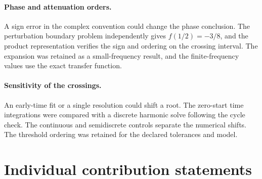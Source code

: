 \documentclass[11pt,a4paper]{article}
\begin{document}
\paragraph{Phase and attenuation orders.} A sign error in the complex convention could change the phase conclusion. The perturbation boundary problem independently gives $f(1/2)=-3/8$, and the product representation verifies the sign and ordering on the crossing interval. The expansion was retained as a small-frequency result, and the finite-frequency values use the exact transfer function.

\paragraph{Sensitivity of the crossings.} An early-time fit or a single resolution could shift a root. The zero-start time integrations were compared with a discrete harmonic solve following the cycle check. The continuous and semidiscrete controls separate the numerical shifts. The threshold ordering was retained for the declared tolerances and model.

\clearpage
\section{Individual contribution statements}
\newcommand{\record}[2]{\def\membername{#1}\def\memberid{#2}}
\record{Shenghao Lin}{2363483}
\clearpage
\record{Davin Jonathan}{2365125}
\clearpage
\record{Jihong Zhuang}{2362142}
\clearpage
\record{Wosi Xie}{2362155}
\clearpage
\record{Yuhan Zhang}{2363574}

\end{document}
